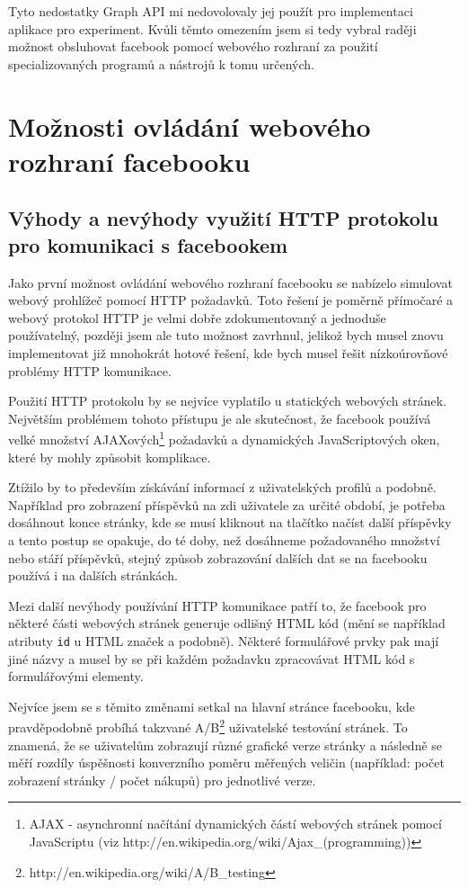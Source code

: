 \documentclass[thesis=M,czech]{FITthesis}[2013/05/10]
\begin{document}
Tyto nedostatky Graph API mi nedovolovaly jej použít pro implementaci  aplikace pro experiment. Kvůli těmto omezením jsem si tedy vybral raději možnost obsluhovat facebook pomocí webového rozhraní za použití specializovaných programů a nástrojů k tomu určených.

\section{Možnosti ovládání webového rozhraní facebooku}

\subsection{Výhody a nevýhody využití HTTP protokolu pro komunikaci s facebookem}

Jako první možnost ovládání webového rozhraní facebooku se nabízelo simulovat webový prohlížeč pomocí HTTP požadavků. Toto řešení je poměrně přímočaré a webový protokol HTTP je velmi dobře zdokumentovaný a jednoduše používatelný, později jsem ale tuto možnost zavrhnul, jelikož bych musel znovu implementovat již mnohokrát hotové řešení, kde bych musel řešit nízkoúrovňové problémy HTTP komunikace. 

Použití HTTP protokolu by se nejvíce vyplatilo u statických webových stránek. Největším problémem tohoto přístupu je ale skutečnost, že facebook používá velké množství AJAXových\footnote{AJAX - asynchronní načítání dynamických částí webových stránek pomocí JavaScriptu (viz http://en.wikipedia.org/wiki/Ajax\_(programming))} požadavků a dynamických JavaScriptových oken, které by mohly způsobit komplikace. 

Ztížilo by to především získávání informací z uživatelských profilů a podobně. Například pro zobrazení příspěvků na zdi uživatele za určité období, je potřeba dosáhnout konce stránky, kde se musí kliknout na tlačítko načíst další příspěvky a tento postup se opakuje, do té doby, než dosáhneme požadovaného množství nebo stáří příspěvků, stejný způsob zobrazování dalších dat se na facebooku používá i na dalších stránkách.

Mezi další nevýhody používání HTTP komunikace patří to, že facebook pro některé části webových stránek generuje odlišný HTML kód (mění se například atributy \verb|id| u HTML značek a podobně). Některé formulářové prvky pak mají jiné názvy a musel by se při každém požadavku zpracovávat HTML kód s formulářovými elementy. 

Nejvíce jsem se s těmito změnami setkal na hlavní stránce facebooku, kde pravděpodobně probíhá takzvané A/B\footnote{http://en.wikipedia.org/wiki/A/B\_testing} uživatelské testování stránek. To znamená, že se uživatelům zobrazují různé grafické verze stránky a následně se měří rozdíly úspěšnosti konverzního poměru měřených veličin (například: počet zobrazení stránky / počet nákupů) pro jednotlivé verze.
\end{document}

